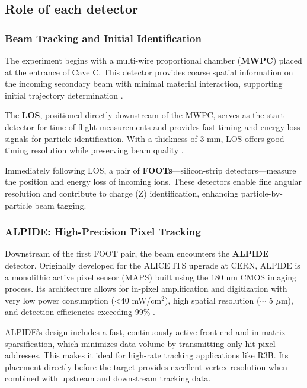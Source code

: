 \subsection{Role of each detector}

\subsubsection{Beam Tracking and Initial Identification}

The experiment begins with a multi-wire proportional chamber (\textbf{MWPC}) placed at the entrance of Cave C. This detector provides coarse spatial information on the incoming secondary beam with minimal material interaction, supporting initial trajectory determination \cite{paschalis_-beam_2015}.

The \textbf{LOS}, positioned directly downstream of the MWPC, serves as the start detector for time-of-flight measurements and provides fast timing and energy-loss signals for particle identification. With a thickness of 3 mm, LOS offers good timing resolution while preserving beam quality \cite{panin2024neutron}.

Immediately following LOS, a pair of \textbf{FOOTs}—silicon-strip detectors—measure the position and energy loss of incoming ions. These detectors enable fine angular resolution and contribute to charge (Z) identification, enhancing particle-by-particle beam tagging.


\subsubsection{ALPIDE: High-Precision Pixel Tracking}

Downstream of the first FOOT pair, the beam encounters the \textbf{ALPIDE} detector. Originally developed for the ALICE ITS upgrade at CERN, ALPIDE is a monolithic active pixel sensor (MAPS) built using the 180 nm CMOS imaging process. Its architecture allows for in-pixel amplification and digitization with very low power consumption (<40 mW/cm$^2$), high spatial resolution ($\sim$ 5 $\mu$m), and detection efficiencies exceeding 99\% \cite{mager_alpide_2016}.

ALPIDE's design includes a fast, continuously active front-end and in-matrix sparsification, which minimizes data volume by transmitting only hit pixel addresses. This makes it ideal for high-rate tracking applications like \gls{R3B}. Its placement directly before the target provides excellent vertex resolution when combined with upstream and downstream tracking data.

